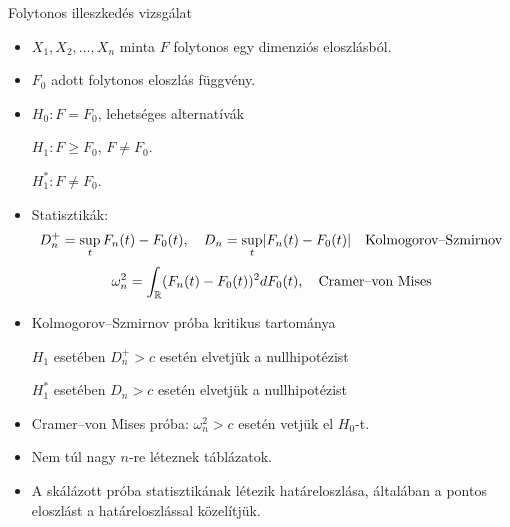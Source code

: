 \documentclass[aspectratio=169,notheorems,9pt,\option]{beamer}
\begin{document}
\begin{frame}{Folytonos illeszkedés vizsgálat}
  \begin{itemize}
    \item $X_1,X_2,\dots,X_n$ minta  $F$ folytonos egy dimenziós
    eloszlásból.
    \item $F_0$ adott folytonos eloszlás függvény.
    \item $H_0: F=F_0$, lehetséges alternatívák
    
    $H_1:F\geq F_0$, $F \neq F_0$.
    
    $H^*_1:F\neq F_0$.
    \item Statisztikák:
    \begin{displaymath}
      D_n^+=\sup_t F_n (t)-F_0 (t),\quad D_n=\sup_t\abs*{F_n (t)-F_0 (t)}\quad\text{Kolmogorov--Szmirnov}
    \end{displaymath}
    \begin{displaymath}
      \omega^2_n=\int_{\mathbb{R}} (F_n (t)-F_0 (t))^2 dF_0 (t),
      \quad\text{Cramer--von Mises}
    \end{displaymath}
    
    \item Kolmogorov--Szmirnov próba kritikus tartománya
    
    $H_1$ esetében $D_n^+>c$ esetén elvetjük a nullhipotézist
    
    $H^*_1$ esetében $D_n>c$ esetén elvetjük a nullhipotézist
    
    \item Cramer--von Mises próba:  $\omega^2_n>c$ esetén vetjük el $H_0$-t.
    
    \item Nem túl nagy $n$-re léteznek táblázatok. 
    \item A skálázott próba statisztikának létezik határeloszlása,
    általában a pontos eloszlást a határeloszlással közelítjük.
  \end{itemize}
\end{frame}
\end{document}

